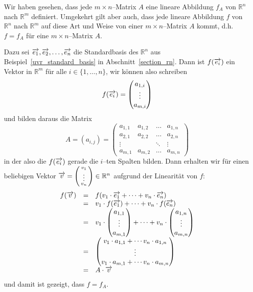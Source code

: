 \begin{notiz}\label{matrix_hom_matrix}
Wir haben gesehen, dass jede $m \times n$--Matrix $A$ eine lineare Abbildung $f_A$ von $\mathbb R^n$ 
nach $\mathbb R^m$ definiert. Umgekehrt gilt aber auch, dass jede lineare Abbildung $f$ von $\mathbb R^n$ 
nach $\mathbb R^m$ auf diese Art und Weise von einer $m \times n$--Matrix $A$ kommt, d.h. $f = f_A$ 
für eine $m \times n$--Matrix $A$.

Dazu sei $ \overrightarrow{e_1}, \overrightarrow{e_2}, \ldots, \overrightarrow{e_n}$ 
die Standardbasis des $\mathbb R^n$ aus Beispiel~\ref{uvr_standard_basis} in 
Abschnitt~\ref{section_rn}. Dann ist $f(\overrightarrow{e_i})$ ein Vektor in 
$\mathbb R^m$ für alle $i \in \{1, \ldots , n\}$, wir können also schreiben
  $$ f(\overrightarrow{e_i}) = 
  \left( \begin{matrix} a_{1,i} \\ \vdots \\ a_{m,i} \end{matrix} \right) $$
und bilden daraus die Matrix 
  	$$ A = \left(a_{i,j}\right) = \left( \begin{matrix} 
 	a_{1,1} & a_{1,2} & \ldots & a_{1,n} \\
   	a_{2,1} & a_{2,2} & \ldots & a_{2,n} \\
    	\vdots & & \ddots & \vdots  \\
    	a_{m,1} & a_{m,2} & \ldots & a_{m,n}
    	\end{matrix} \right) $$
in der also die $f(\overrightarrow{e_i})$ gerade die $i$--ten Spalten bilden. Dann 
erhalten wir für einen beliebigen Vektor $\overrightarrow{v} = \left( 
\begin{smallmatrix} v_1 \\ \vdots \\ v_n \end{smallmatrix} \right) \in \mathbb R^n$ 
aufgrund der Linearität von $f$:
  	$$ \begin{array} {l c l}
  	f(\overrightarrow{v}) & = & f(v_1 \cdot \overrightarrow{e_1} + \cdots + v_n \cdot \overrightarrow{e_n}) \\
  	& = & v_1 \cdot f(\overrightarrow{e_1}) + \cdots + v_n \cdot f(\overrightarrow{e_n}) \\
  	& = & v_1 \cdot \left(\begin{matrix} a_{1,1} \\ \vdots \\ a_{m,1}\end{matrix}\right) + \cdots + 
	v_n \cdot  \left( \begin{matrix} a_{1,n} \\ \vdots \\ a_{m,n} \end{matrix} \right) \\
  	& = & \left( \begin{matrix} v_1 \cdot a_{1,1} + \cdots v_n \cdot a_{1,n} \\ 
	\vdots \\ v_1 \cdot a_{m,1} + \cdots v_n \cdot a_{m,n} \end{matrix} \right) \\
  	& = & A \cdot \overrightarrow{v}
  	\end{array} $$
und damit ist gezeigt, dass $f = f_A$.


\end{notiz}
